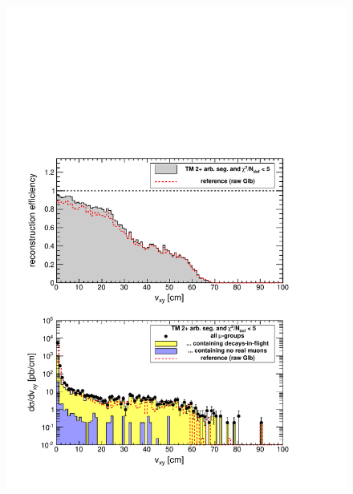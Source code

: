 \documentclass[12pt]{article}
\begin{document}
\begin{figure}
\begin{center}
\begin{multicols}{2}
\includegraphics[width=\linewidth]{fig/backgrounds3_plot/dispvert_TrackerSegMatch2NormChi2.pdf}


\end{multicols}
\end{center}
\end{figure}
\end{document}
